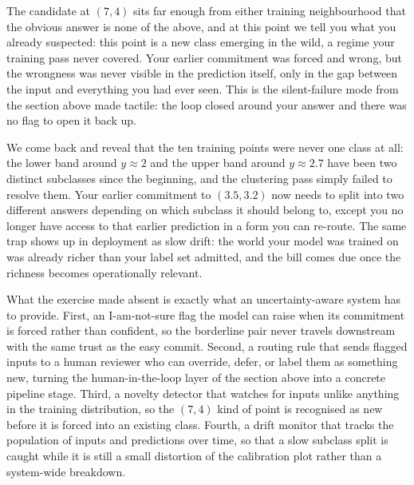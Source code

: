 
The candidate at $(7, 4)$ sits far enough from either training neighbourhood that the obvious answer is none of the above, and at this point we tell you what you already suspected: this point is a new class emerging in the wild, a regime your training pass never covered.
Your earlier commitment was forced and wrong, but the wrongness was never visible in the prediction itself, only in the gap between the input and everything you had ever seen.
This is the silent-failure mode from the section above made tactile: the loop closed around your answer and there was no flag to open it back up.

We come back and reveal that the ten training points were never one class at all: the lower band around $y \approx 2$ and the upper band around $y \approx 2.7$ have been two distinct subclasses since the beginning, and the clustering pass simply failed to resolve them.
Your earlier commitment to $(3.5, 3.2)$ now needs to split into two different answers depending on which subclass it should belong to, except you no longer have access to that earlier prediction in a form you can re-route.
The same trap shows up in deployment as slow drift: the world your model was trained on was already richer than your label set admitted, and the bill comes due once the richness becomes operationally relevant.

What the exercise made absent is exactly what an uncertainty-aware system has to provide.
First, an I-am-not-sure flag the model can raise when its commitment is forced rather than confident, so the borderline pair never travels downstream with the same trust as the easy commit.
Second, a routing rule that sends flagged inputs to a human reviewer who can override, defer, or label them as something new, turning the human-in-the-loop layer of the section above into a concrete pipeline stage.
Third, a novelty detector that watches for inputs unlike anything in the training distribution, so the $(7, 4)$ kind of point is recognised as new before it is forced into an existing class.
Fourth, a drift monitor that tracks the population of inputs and predictions over time, so that a slow subclass split is caught while it is still a small distortion of the calibration plot rather than a system-wide breakdown.

